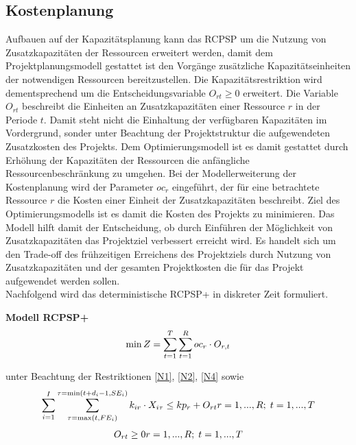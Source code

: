 \documentclass[a4paper,12pt,parskip,bibtotoc,liststotoc]{article}
\begin{document}
\subsection{Kostenplanung}
Aufbauen auf der Kapazitätsplanung kann das RCPSP um die Nutzung von Zusatzkapazitäten der Ressourcen erweitert werden, damit dem Projektplanungsmodell gestattet ist den Vorgänge zusätzliche Kapazitätseinheiten der notwendigen Ressourcen bereitzustellen. Die Kapazitätsrestriktion wird dementsprechend um die Entscheidungsvariable $O_{rt} \geq 0$ erweitert. Die Variable $O_{rt}$ beschreibt die Einheiten an Zusatzkapazitäten einer Ressource $r$ in der Periode $t$. Damit steht nicht die Einhaltung der verfügbaren Kapazitäten im Vordergrund, sonder unter Beachtung der Projektstruktur die aufgewendeten Zusatzkosten des Projekts. Dem Optimierungsmodell ist es damit gestattet durch Erhöhung der Kapazitäten der Ressourcen die anfängliche Ressourcenbeschränkung zu umgehen. Bei der Modellerweiterung der Kostenplanung wird der Parameter $oc_r$ eingeführt, der für eine betrachtete Ressource $r$ die Kosten einer Einheit der Zusatzkapazitäten beschreibt. Ziel des Optimierungsmodells ist es damit die Kosten des Projekts zu minimieren. Das Modell hilft damit der Entscheidung, ob durch Einführen der Möglichkeit von Zusatzkapazitäten das Projektziel verbessert erreicht wird. Es handelt sich um den Trade-off des frühzeitigen Erreichens des Projektziels durch Nutzung von Zusatzkapazitäten und der gesamten Projektkosten die für das Projekt aufgewendet werden sollen.\\

Nachfolgend wird das deterministische RCPSP+ in diskreter Zeit formuliert.

\textbf{Modell RCPSP+}
\begin{eqnarray} \label{Ziel2}
\min Z = \sum_{t=1}^{T}\sum_{t=1}^{R} oc_{r} \cdot O_{r,t}\hfill  
\end{eqnarray}

unter Beachtung der Restriktionen \eqref{N1}, \eqref{N2}, \eqref{N4} sowie
\begin{multline} \label{N5}
\sum_{i=1}^{I}\sum_{\tau=\max(t,FE_{i})}^{\tau=\min(t+d_i-1,SE_i)}k_ {ir} \cdot X_{i\tau} \leq kp_{r} + O_{rt}
\hfill   r =1,...,R;\; t=1,...,T
\end{multline}\vspace{-3.0ex}
\begin{multline} \label{N6}
O_{rt} \geq 0
\hfill   r =1,...,R;\; t=1,...,T \end{multline}\vspace{-6.0ex}\\
\end{document}
